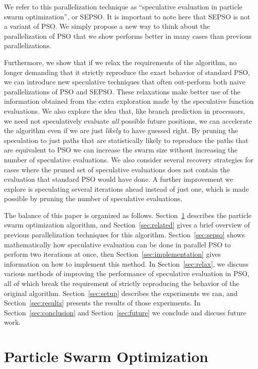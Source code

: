 \documentclass[smallcondensed]{svjour3}
\renewcommand{\sec}[1]{Section~\ref{sec:#1}}
\begin{document}
We refer to this parallelization technique as ``speculative evaluation in
particle swarm optimization'', or SEPSO.  It is important to note here that
SEPSO is not a variant of PSO.  We simply propose a new way to think about the
parallelization of PSO that we show performs better in many cases than previous
parallelizations.

Furthermore, we show that if we relax the requirements of the algorithm, no
longer demanding that it strictly reproduce the exact behavior of standard PSO,
we can introduce new speculative techniques that often out-perform both naive
parallelizations of PSO and SEPSO.  These relaxations make better use of the
information obtained from the extra exploration made by the speculative
function evaluations.  We also explore the idea that, like branch prediction in
processors, we need not speculatively evaluate \emph{all} possible future
positions, we can accelerate the algorithm even if we are just \emph{likely} to
have guessed right.  By pruning the speculation to just paths that are
statistically likely to reproduce the paths that are equivalent to PSO we can
increase the swarm size without increasing the number of speculative
evaluations.  We also consider several recovery strategies for cases where the
pruned set of speculative evaluations does not contain the evaluation that
standard PSO would have done.  A further improvement we explore is speculating
several iterations ahead instead of just one, which is made possible by pruning
the number of speculative evaluations.

The balance of this paper is organized as follows. \sec{pso} describes the
particle swarm optimization algorithm, and \sec{related} gives a brief overview
of previous parallelization techniques for this algorithm.  \sec{sepso} shows
mathematically how speculative evaluation can be done in parallel PSO to
perform two iterations at once, then \sec{implementation} gives information on
how to implement this method.  In \sec{relax}, we discuss various methods of
improving the performance of speculative evaluation in PSO, all of which break
the requirement of strictly reproducing the behavior of the original algorithm.
\sec{setup} describes the experiments we ran, and \sec{results} presents the
results of those experiments.  In \sec{conclusion} and \sec{future} we conclude
and discuss future work.

\section{Particle Swarm Optimization}
\label{sec:pso}
\end{document}
